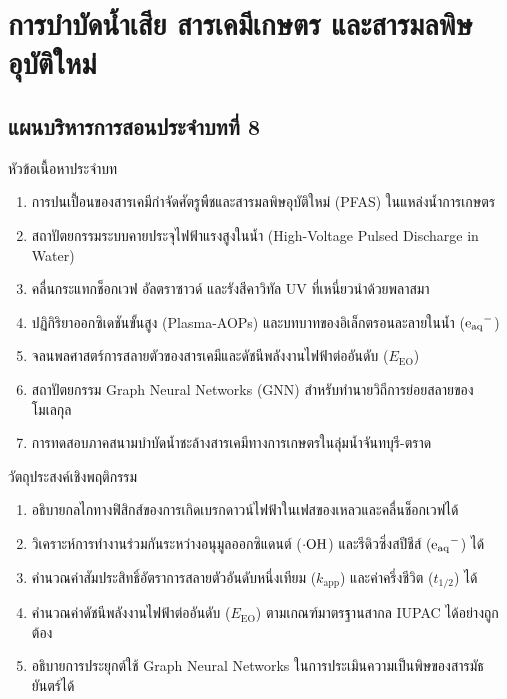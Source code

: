 \chapter{การบำบัดน้ำเสีย สารเคมีเกษตร และสารมลพิษอุบัติใหม่}
\label{chap:ch08}


\vspace*{-6pt}
\section*{แผนบริหารการสอนประจำบทที่ 8}

\begin{planbox}{หัวข้อเนื้อหาประจำบท}
\begin{enumerate}
    \item การปนเปื้อนของสารเคมีกำจัดศัตรูพืชและสารมลพิษอุบัติใหม่ (PFAS) ในแหล่งน้ำการเกษตร
    \item สถาปัตยกรรมระบบคายประจุไฟฟ้าแรงสูงในน้ำ (High-Voltage Pulsed Discharge in Water)
    \item คลื่นกระแทกช็อกเวฟ อัลตราซาวด์ และรังสีคาวิทัล UV ที่เหนี่ยวนำด้วยพลาสมา
    \item ปฏิกิริยาออกซิเดชันขั้นสูง (Plasma-AOPs) และบทบาทของอิเล็กตรอนละลายในน้ำ ($\ce{e_{aq}^-}$)
    \item จลนพลศาสตร์การสลายตัวของสารเคมีและดัชนีพลังงานไฟฟ้าต่ออันดับ ($E_{\text{EO}}$)
    \item สถาปัตยกรรม Graph Neural Networks (GNN) สำหรับทำนายวิถีการย่อยสลายของโมเลกุล
    \item การทดสอบภาคสนามบำบัดน้ำชะล้างสารเคมีทางการเกษตรในลุ่มน้ำจันทบุรี-ตราด
\end{enumerate}
\end{planbox}

\begin{planbox}{วัตถุประสงค์เชิงพฤติกรรม}
\begin{enumerate}
    \item อธิบายกลไกทางฟิสิกส์ของการเกิดเบรกดาวน์ไฟฟ้าในเฟสของเหลวและคลื่นช็อกเวฟได้
    \item วิเคราะห์การทำงานร่วมกันระหว่างอนุมูลออกซิแดนต์ ($\cdot\ce{OH}$) และรีดิวซิ่งสปีชีส์ ($\ce{e_{aq}^-}$) ได้
    \item คำนวณค่าสัมประสิทธิ์อัตราการสลายตัวอันดับหนึ่งเทียม ($k_{\text{app}}$) และค่าครึ่งชีวิต ($t_{1/2}$) ได้
    \item คำนวณค่าดัชนีพลังงานไฟฟ้าต่ออันดับ ($E_{\text{EO}}$) ตามเกณฑ์มาตรฐานสากล IUPAC ได้อย่างถูกต้อง
    \item อธิบายการประยุกต์ใช้ Graph Neural Networks ในการประเมินความเป็นพิษของสารมัธยันตร์ได้
\end{enumerate}
\end{planbox}

